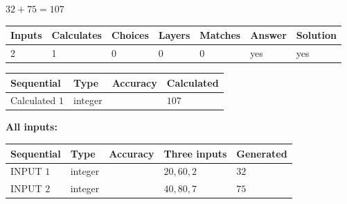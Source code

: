 \documentclass[12pt]{article}
\begin{document}
 

 
 
 
\noindent{}
 
 

$ %
32 +  %
75=   %
107$
 
 
\noindent{}
 
 

 
   
   
   
   
\noindent\begin{tabular}{|l|l|l|l|l|l|l|}
 \hline
Inputs & Calculates & Choices & Layers & Matches & Answer & Solution \\ \hline
 2  & 
 1  & 
 0
  & 
 0  & 
 0  & 
  yes & 
  yes 
  \\ \hline
 \end{tabular}
   
   
   
   
\noindent{}
   
   
  
  
\noindent\begin{tabular}{|l|l|l|l|}
\hline
 Sequential & Type & Accuracy & Calculated \\ 
\hline
 
 
  Calculated $  1 $ & integer &  & 
  $ 107 $ 
 \\  \hline  
 \end{tabular}
   
   
   
   
\noindent\vspace{0.1in}\hspace{-0.08in} {\textbf{\Large{All inputs: }}}
   
   
  
  
\noindent\begin{tabular}{|l|l|l|l|l|}
\hline
 Sequential & Type & Accuracy & Three inputs & Generated \\ 
\hline
 
 
  INPUT $  1 $ & integer &  & $
 20
 , 
 60
 , 
 2
 $ & $ 32 $ 
 \\  \hline  
 
 
  INPUT $  2 $ & integer &  & $
 40
 , 
 80
 , 
 7
 $ & $ 75 $ 
 \\  \hline  
 \end{tabular}
   
\end{document}
